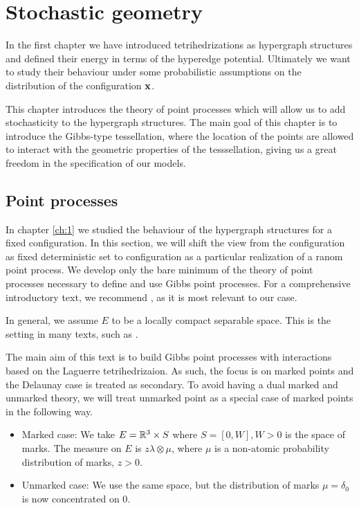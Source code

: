\chapter{Stochastic geometry}\label{ch:2}
In the first chapter we have introduced tetrihedrizations as hypergraph structures and defined their energy in terms of the hyperedge potential. Ultimately we want to study their behaviour under some probabilistic assumptions on the distribution of the configuration ${\mathbf{x}}$. 

This chapter introduces the theory of point processes which will allow us to add stochasticity to the hypergraph structures. The main goal of this chapter is to introduce the Gibbs-type tessellation, where the location of the points are allowed to interact with the geometric properties of the tesssellation, giving us a great freedom in the specification of our models.

\section{Point processes}
In chapter \ref{ch:1} we studied the behaviour of the hypergraph structures for a fixed configuration. In this section, we will shift the view from the configuration as fixed deterministic set to configuration as a particular realization of a ranom point process.
We develop only the bare minimum of the theory of point processes necessary to define and use Gibbs point processes. For a comprehensive introductory text, we recommend \cite{MollerWaagepetersen2003}, as it is most relevant to our case. \newline

\noindent In general, we assume $E$ to be a locally compact separable space. This is the setting in many texts, such as \cite{SchneiderWeil2008}.

The main aim of this text is to build Gibbs point processes with interactions based on the Laguerre tetrihedrizaion. As such, the focus is on marked points and the Delaunay case is treated as secondary. To avoid having a dual marked and unmarked theory, we will treat unmarked point as a special case of marked points in the following way. 

\begin{itemize}
	\item Marked case: We take $E={\mathbb R^3}\times S$ where $S=[0,W],W>0$ is the space of marks. The measure on $E$ is $z\lambda \otimes \mu$, where $\mu$ is a non-atomic probability distribution of marks, $z>0$. 
	\item Unmarked case: We use the same space, but the distribution of marks $\mu=\delta_0$ is now concentrated on $0$.
\end{itemize}



